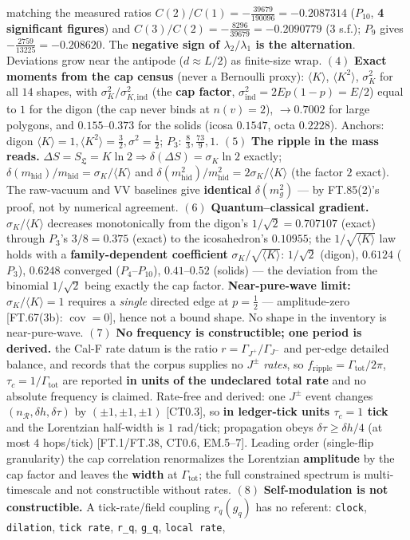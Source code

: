 \begin{theorem}
matching the measured ratios $C(2)/C(1)=-\tfrac{39679}{190096}=-0.2087314$ ($P_{10}$, \textbf{4 significant figures}) and $C(3)/C(2)=-\tfrac{8296}{39679}=-0.2090779$ (3 s.f.); $P_9$ gives $-\tfrac{2759}{13225}=-0.208620$. The \textbf{negative sign of $\lambda_2/\lambda_1$ is the alternation}. Deviations grow near the antipode ($d\approx L/2$) as finite-size wrap. $(4)$ \textbf{Exact moments from the cap census} (never a Bernoulli proxy): $\langle K\rangle$, $\langle K^2\rangle$, $\sigma_K^2$ for all $14$ shapes, with $\sigma_K^2/\sigma_{K,\mathrm{ind}}^2$ (the \textbf{cap factor}, $\sigma^2_{\mathrm{ind}}=2Ep(1-p)=E/2$) equal to $1$ for the digon (the cap never binds at $n(v)=2$), $\to0.7002$ for large polygons, and $0.155$–$0.373$ for the solids (icosa $0.1547$, octa $0.2228$). Anchors: digon $\langle K\rangle=1,\langle K^2\rangle=\tfrac32,\sigma^2=\tfrac12$; $P_3$: $\tfrac83,\tfrac{73}9,1$. $(5)$ \textbf{The ripple in the mass reads.} $\Delta S=S_{\mathfrak L}=K\ln2\Rightarrow\delta(\Delta S)=\sigma_K\ln2$ exactly; $\delta(m_{\mathrm{hid}})/m_{\mathrm{hid}}=\sigma_K/\langle K\rangle$ and $\delta(m_{\mathrm{hid}}^2)/m_{\mathrm{hid}}^2=2\sigma_K/\langle K\rangle$ (the factor $2$ exact). The raw-vacuum and VV baselines give \textbf{identical} $\delta(m_g^2)$ — by FT.85(2)'s proof, not by numerical agreement. $(6)$ \textbf{Quantum–classical gradient.} $\sigma_K/\langle K\rangle$ decreases monotonically from the digon's $1/\sqrt2=0.707107$ (exact) through $P_3$'s $3/8=0.375$ (exact) to the icosahedron's $0.10955$; the $1/\sqrt{\langle K\rangle}$ law holds with a \textbf{family-dependent coefficient} $\sigma_K/\sqrt{\langle K\rangle}$: $1/\sqrt2$ (digon), $0.6124$ ($P_3$), $0.6248$ converged ($P_4$–$P_{10}$), $0.41$–$0.52$ (solids) — the deviation from the binomial $1/\sqrt2$ being exactly the cap factor. \textbf{Near-pure-wave limit:} $\sigma_K/\langle K\rangle=1$ requires a \textit{single} directed edge at $p=\tfrac12$ — amplitude-zero [FT.67(3b): $\operatorname{cov}=0$], hence not a bound shape. No shape in the inventory is near-pure-wave. $(7)$ \textbf{No frequency is constructible; one period is derived.} the Cal-F rate datum is the ratio $r=\Gamma_{J^+}/\Gamma_{J^-}$ and per-edge detailed balance, and records that the corpus supplies no $J^\pm$ \textit{rates}, so $f_{\mathrm{ripple}}=\Gamma_{\mathrm{tot}}/2\pi$, $\tau_c=1/\Gamma_{\mathrm{tot}}$ are reported \textbf{in units of the undeclared total rate} and no absolute frequency is claimed. Rate-free and derived: one $J^\pm$ event changes $(n_{\mathcal R},\delta h,\delta\tau)$ by $(\pm1,\pm1,\pm1)$ [CT0.3], so \textbf{in ledger-tick units $\tau_c=1$ tick} and the Lorentzian half-width is $1$ rad/tick; propagation obeys $\delta\tau\ge\delta h/4$ (at most $4$ hops/tick) [FT.1/FT.38, CT0.6, EM.5–7]. Leading order (single-flip granularity) the cap correlation renormalizes the Lorentzian \textbf{amplitude} by the cap factor and leaves the \textbf{width} at $\Gamma_{\mathrm{tot}}$; the full constrained spectrum is multi-timescale and not constructible without rates. $(8)$ \textbf{Self-modulation is not constructible.} A tick-rate/field coupling $r_q(g_q)$ has no referent: \texttt{clock}, \texttt{dilation}, \texttt{tick\ rate}, \texttt{r\_\allowbreak{}q}, \texttt{g\_\allowbreak{}q}, \texttt{local\ rate}, 
\end{theorem}
